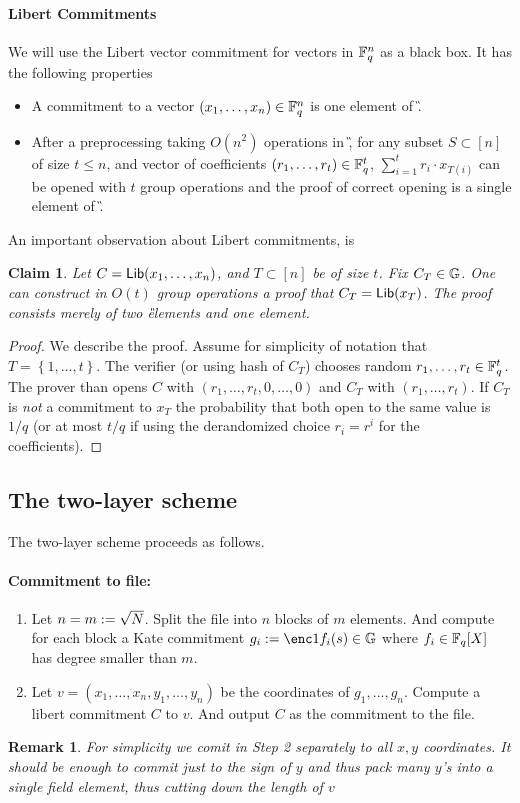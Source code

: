 \documentclass[11pt]{article}
\numberwithin{figure}{section} %
\newtheorem{remark}[thm]{Remark}
\newtheorem{claim}[thm]{Claim}
\newcommand{\set}[1]{\ensuremath{\left\{#1\right\}}\xspace}
\begin{document}
\paragraph{Libert Commitments}
We will use the Libert vector commitment for vectors in ${\mathbb F}_q^n$ as a black box.
It has the following properties
 \begin{itemize}
  \item A commitment to a vector $(x_1,\ldots,x_n)\in {\mathbb F}_q^n$ is one element of \G.
  \item After a preprocessing taking $O(n^2)$ operations in \G, for any subset $S\subset [n]$ of size  $t\leq n$, and vector of coefficients $(r_1,\ldots,r_t)\in {\mathbb F}_q^t$, $\sum_{i=1}^t r_i\cdot x_{T(i)}$
  can be opened with $t$ group operations and the proof of correct opening is a single element of \G.
 \end{itemize}

 An important observation about Libert commitments, is
 \begin{claim}\label{clm:libertsubset}
Let $C=\mathsf{Lib}(x_1,\ldots,x_n)$, and  $T\subset [n]$ be of size $t$.
Fix  $C_T\in {\mathbb G}$. One can construct in $O(t)$ group operations a proof that $C_T=\mathsf{Lib}(x_T)$.
The proof consists merely of two \G elements and one \F element.
 \end{claim}
\begin{proof}
 We describe the proof. Assume for simplicity of notation that $T=\set{1,\ldots,t}$.
 The verifier (or using hash of $C_T$) chooses random $r_1,\ldots,r_t \in {\mathbb F}_q^t$.
 The prover than opens  $C$ with $(r_1,\ldots,r_t,0,\ldots,0)$
 and $C_T$ with $(r_1,\ldots,r_t)$.
 If $C_T$ is \emph{not} a commitment to $x_T$ the probability that both open to the same value
 is $1/q$ (or at most $t/q$ if using the derandomized choice $r_i=r^i$ for the coefficients).
 
\end{proof}

 
 
 
 \subsection{The two-layer scheme}
 
 The two-layer scheme proceeds as follows.
 \paragraph{Commitment to file:}
 \begin{enumerate}
  \item Let $n=m:= \sqrt{N}$. Split the file into $n$ blocks of $m$ elements. And compute for each block a Kate commitment $g_i\defeq \enc1{f_i(s)}\in \G$ where $f_i\in {\mathbb F}_q[X]$ has degree smaller than $m$.
  \item Let $v=(x_1,\ldots,x_n,y_1,\ldots,y_n)$ be the coordinates of $g_1,\ldots,g_n$. Compute a libert commitment $C$ to $v$. And output $C$ as the commitment to the file.
 \end{enumerate}
\begin{remark}
 For simplicity we comit in Step 2 separately to all $x,y$ coordinates. It should be enough to commit just to the sign of $y$ and thus pack many $y$'s into a single field element, thus cutting down the length of $v$
\end{remark}
\end{document}
